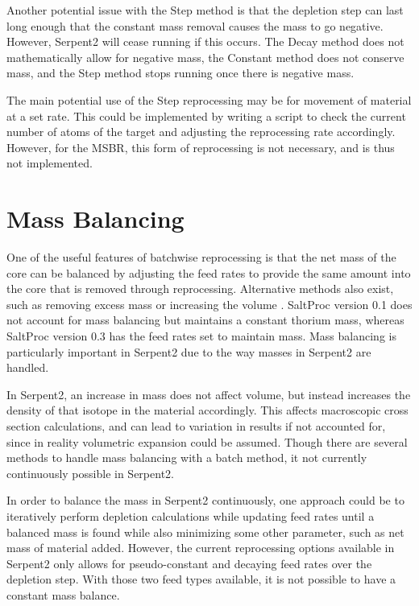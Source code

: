 Another potential issue with the Step method is that the depletion step can last long enough that the constant mass removal causes the mass to go negative. However, Serpent2 will cease running if this occurs. The Decay method does not mathematically allow for negative mass, the Constant method does not conserve mass, and the Step method stops running once there is negative mass.

The main potential use of the Step reprocessing may be for movement of material at a set rate. This could be implemented by writing a script to check the current number of atoms of the target and adjusting the reprocessing rate accordingly. However, for the MSBR, this form of reprocessing is not necessary, and is thus not implemented.

\section{Mass Balancing}

One of the useful features of batchwise reprocessing is that the net mass of the core can be balanced by adjusting the feed rates to provide the same amount into the core that is removed through reprocessing. Alternative methods also exist, such as removing excess mass or increasing the volume \cite{ridley_method_2017}. SaltProc version 0.1 does not account for mass balancing but maintains a constant thorium mass, whereas SaltProc version 0.3 has the feed rates set to maintain mass. Mass balancing is particularly important in Serpent2 due to the way masses in Serpent2 are handled.

In Serpent2, an increase in mass does not affect volume, but instead increases the density of that isotope in the material accordingly. This affects macroscopic cross section calculations, and can lead to variation in results if not accounted for, since in reality volumetric expansion could be assumed. Though there are several methods to handle mass balancing with a batch method, it not currently continuously possible in Serpent2.

In order to balance the mass in Serpent2 continuously, one approach could be to iteratively perform depletion calculations while updating feed rates until a balanced mass is found while also minimizing some other parameter, such as net mass of material added. However, the current reprocessing options available in Serpent2 only allows for pseudo-constant and decaying feed rates over the depletion step. With those two feed types available, it is not possible to have a constant mass balance.

